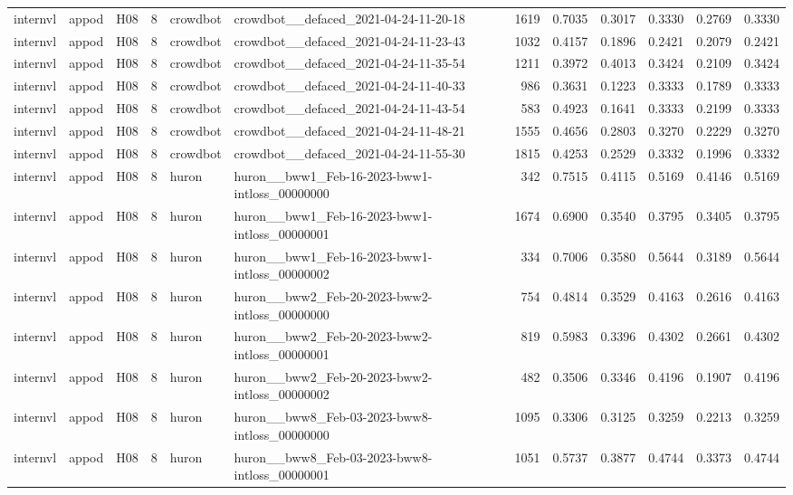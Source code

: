 \begin{table}[tbp]
\begin{tabular}{lllrllrrrrrr}
internvl & appod & H08 & 8 & crowdbot & crowdbot\_\_defaced\_2021-04-24-11-20-18 & 1619 & 0.7035 & 0.3017 & 0.3330 & 0.2769 & 0.3330 \\
internvl & appod & H08 & 8 & crowdbot & crowdbot\_\_defaced\_2021-04-24-11-23-43 & 1032 & 0.4157 & 0.1896 & 0.2421 & 0.2079 & 0.2421 \\
internvl & appod & H08 & 8 & crowdbot & crowdbot\_\_defaced\_2021-04-24-11-35-54 & 1211 & 0.3972 & 0.4013 & 0.3424 & 0.2109 & 0.3424 \\
internvl & appod & H08 & 8 & crowdbot & crowdbot\_\_defaced\_2021-04-24-11-40-33 & 986 & 0.3631 & 0.1223 & 0.3333 & 0.1789 & 0.3333 \\
internvl & appod & H08 & 8 & crowdbot & crowdbot\_\_defaced\_2021-04-24-11-43-54 & 583 & 0.4923 & 0.1641 & 0.3333 & 0.2199 & 0.3333 \\
internvl & appod & H08 & 8 & crowdbot & crowdbot\_\_defaced\_2021-04-24-11-48-21 & 1555 & 0.4656 & 0.2803 & 0.3270 & 0.2229 & 0.3270 \\
internvl & appod & H08 & 8 & crowdbot & crowdbot\_\_defaced\_2021-04-24-11-55-30 & 1815 & 0.4253 & 0.2529 & 0.3332 & 0.1996 & 0.3332 \\
internvl & appod & H08 & 8 & huron & huron\_\_bww1\_Feb-16-2023-bww1-intloss\_00000000 & 342 & 0.7515 & 0.4115 & 0.5169 & 0.4146 & 0.5169 \\
internvl & appod & H08 & 8 & huron & huron\_\_bww1\_Feb-16-2023-bww1-intloss\_00000001 & 1674 & 0.6900 & 0.3540 & 0.3795 & 0.3405 & 0.3795 \\
internvl & appod & H08 & 8 & huron & huron\_\_bww1\_Feb-16-2023-bww1-intloss\_00000002 & 334 & 0.7006 & 0.3580 & 0.5644 & 0.3189 & 0.5644 \\
internvl & appod & H08 & 8 & huron & huron\_\_bww2\_Feb-20-2023-bww2-intloss\_00000000 & 754 & 0.4814 & 0.3529 & 0.4163 & 0.2616 & 0.4163 \\
internvl & appod & H08 & 8 & huron & huron\_\_bww2\_Feb-20-2023-bww2-intloss\_00000001 & 819 & 0.5983 & 0.3396 & 0.4302 & 0.2661 & 0.4302 \\
internvl & appod & H08 & 8 & huron & huron\_\_bww2\_Feb-20-2023-bww2-intloss\_00000002 & 482 & 0.3506 & 0.3346 & 0.4196 & 0.1907 & 0.4196 \\
internvl & appod & H08 & 8 & huron & huron\_\_bww8\_Feb-03-2023-bww8-intloss\_00000000 & 1095 & 0.3306 & 0.3125 & 0.3259 & 0.2213 & 0.3259 \\
internvl & appod & H08 & 8 & huron & huron\_\_bww8\_Feb-03-2023-bww8-intloss\_00000001 & 1051 & 0.5737 & 0.3877 & 0.4744 & 0.3373 & 0.4744 \\

\end{tabular}
\end{table}
